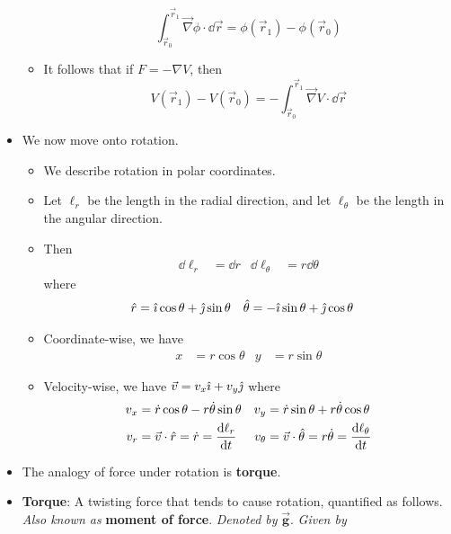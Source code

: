 \documentclass[../notes.tex]{subfiles}
\begin{document}
\begin{itemize}
\begin{itemize}
        \begin{equation*}
            \int_{\vec{r}_0}^{\vec{r}_1}\vec{\nabla}\phi\cdot\dd\vec{r} = \phi(\vec{r}_1)-\phi(\vec{r}_0)
        \end{equation*}
        \item It follows that if $F=-\nabla V$, then
        \begin{equation*}
            V(\vec{r}_1)-V(\vec{r}_0) = -\int_{\vec{r}_0}^{\vec{r}_1}\vec{\nabla}V\cdot\dd\vec{r}
        \end{equation*}
    \end{itemize}
    \item We now move onto rotation.
    \begin{itemize}
        \item We describe rotation in polar coordinates.
        \item Let $\ell_r$ be the length in the radial direction, and let $\ell_\theta$ be the length in the angular direction.
        \item Then
        \begin{align*}
            \dd\ell_r &= \dd{r}&
            \dd\ell_\theta &= r\dd\theta
        \end{align*}
        where
        \begin{align*}
            \hat{r} &= \hat{\imath}\cos\theta+\hat{\jmath}\sin\theta&
            \hat{\theta} &= -\hat{\imath}\sin\theta+\hat{\jmath}\cos\theta
        \end{align*}
        \item Coordinate-wise, we have
        \begin{align*}
            x &= r\cos\theta&
            y &= r\sin\theta
        \end{align*}
        \item Velocity-wise, we have $\vec{v}=v_x\hat{\imath}+v_y\hat{\jmath}$ where
        \begin{align*}
            v_x &= \dot{r}\cos\theta-r\dot{\theta}\sin\theta&
                v_y &= \dot{r}\sin\theta+r\dot{\theta}\cos\theta\\
            v_r &= \vec{v}\cdot\hat{r} = \dot{r} = \dv{\ell_r}{t}&
                v_\theta &= \vec{v}\cdot\hat{\theta} = r\dot{\theta} = \dv{\ell_\theta}{t}
        \end{align*}
    \end{itemize}
    \item The analogy of force under rotation is \textbf{torque}.
    \item \textbf{Torque}: A twisting force that tends to cause rotation, quantified as follows. \emph{Also known as} \textbf{moment of force}. \emph{Denoted by} $\bm{\vec{g}}$. \emph{Given by}

\end{itemize}
\end{document}
